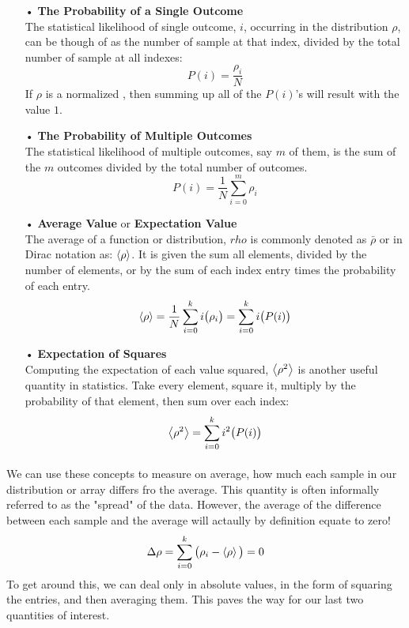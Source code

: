 \documentclass[12pt,letterpaper]{book}
\begin{document}
\begin{enumerate}
\item[•]\textbf{The Probability of a Single Outcome}\\
The statistical likelihood of single outcome, $i$, occurring in the distribution $\rho$, can be though of as the number of sample at that index, divided by the total number of sample at all indexes:
\begin{equation}
\label{disc prob}
P(i) = \frac{\rho_i}{N}
\end{equation}
If $\rho$ is a normalized , then summing up all of the $P(i)$'s will result with the value $1$.
\item[•]\textbf{The Probability of Multiple Outcomes}\\
The statistical likelihood of multiple outcomes, say $m$ of them, is the sum of the $m$ outcomes divided by the total number of outcomes.
\begin{equation}
\label{disc multi prob}
P(i) = \frac{1}{N} \sum_{i=0}^{m}\rho_i
\end{equation}
\item[•]\textbf{Average Value} or \textbf{Expectation Value}\\
The average of a function or distribution, $rho$ is commonly denoted as $\bar{\rho}$ or in Dirac notation as: $\expval{\rho}$. It is given the sum all elements, divided by the number of elements, or by the sum of each index entry times the probability of each entry.
\begin{equation}
\label{expect val}
\expval{\rho} = \frac{1}{N} \sum_{i=0}^{k} i\big(\rho_i\big) = \sum_{i=0}^{k} i \big(P(i)\big)
\end{equation}
\item[•]\textbf{Expectation of Squares}\\
Computing the expectation of each value squared, $\expval{\rho^2}$ is another useful quantity in statistics. Take every element, square it,  multiply by the probability of that element, then sum over each index:
\begin{equation}
\label{expect val sq}
\expval{\rho^2} = \sum_{i=0}^{k} i^2 \big( P(i) \big)
\end{equation}
\end{enumerate}

\paragraph*{}We can use these concepts to measure on average, how much each sample in our distribution or array differs fro the average. This quantity is often informally referred to as the "spread" of the data. However, the average of the difference between each sample and the average will actaully by definition equate to zero!
\begin{equation}
\label{spread}
\Delta \rho = \sum_{i=0}^{k} \big( \rho_i - \expval{\rho} \big) = 0
\end{equation}
To get around this, we can deal only in absolute values, in the form of squaring the entries, and then averaging them. This paves the way for our last two quantities of interest.
\end{document}
